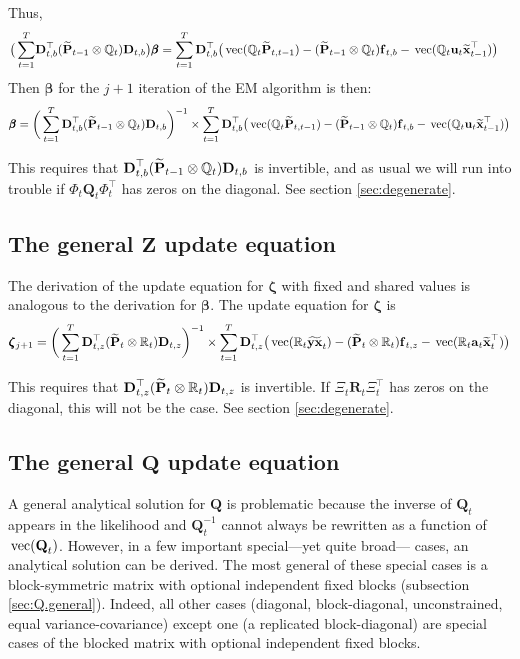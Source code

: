 \documentclass[]{article}
\def\bbeta{\pmb{\beta}}
\def\zzeta{\pmb{\zeta}}
\def\ZZ{\mbox{$\mathbf Z$}}	\def\zz{\mbox{$\mathbf z$}}
\def\DD{\mbox{$\mathbf D$}}	\def\dd{\mbox{$\mathbf d$}}
\def\PP{\mbox{$\mathbf P$}}  \def\pp{\mbox{$\mathbf p$}}
\def\QQ{\mbox{$\mathbf Q$}}	 \def\qq{\mbox{$\mathbf q$}}
\def\RR{\mbox{$\mathbf R$}}	 \def\rr{\mbox{$\mathbf r$}}
\def\vec{\,\textup{\textrm{vec}}}
\def\hatxt{\widetilde{\mbox{$\mathbf x$}}_t}
\def\hatxtm{\widetilde{\mbox{$\mathbf x$}}_{t-1}}
\def\hatYXt{\widetilde{\mbox{$\mathbf{y}\mathbf{x}$}}_t}
\def\hatPt{\widetilde{\PP}_t}
\def\hatPtm{\widetilde{\PP}_{t-1}}
\def\hatPttm{\widetilde{\PP}_{t,t-1}}
\begin{document}
Thus,
\begin{equation}
\begin{split}
\big(\sum_{t=1}^T &\DD_{t,b}^\top(\hatPtm  \otimes \Qm_t)\DD_{t,b} \big)\bbeta 
 =  \sum_{t=1}^T \DD_{t,b}^\top \big(\vec(\Qm_t\hatPttm) - (\hatPtm \otimes \Qm_t)\ff_{t,b} - \vec(\Qm_t\uu_t\hatxtm^\top)  \big)
\end{split}
\end{equation}
Then $\bbeta$ for the $j+1$ iteration of the EM algorithm is then:
\begin{equation}\label{eq:B.general4}
\begin{split}
\bbeta = \bigg(\sum_{t=1}^T \DD_{t,b}^\top(\hatPtm  \otimes \Qm_t)\DD_{t,b} \bigg)^{-1}
\times \sum_{t=1}^T \DD_{t,b}^\top \big(\vec(\Qm_t\hatPttm) - (\hatPtm \otimes \Qm_t)\ff_{t,b} - \vec(\Qm_t\uu_t\hatxtm^\top)  \big)
\end{split}
\end{equation}

This requires that $\DD_{t,b}^\top(\hatPtm  \otimes \Qm_t)\DD_{t,b}$ is invertible, and as usual we will run into trouble if $\Phi_t\QQ_t\Phi_t^\top$ has zeros on the diagonal. See section \ref{sec:degenerate}.

\subsection{The general $\ZZ$ update equation}\label{sec:constZ}
The derivation of the update equation for $\zzeta$ with fixed and shared values is analogous to the derivation for $\bbeta$.  The update equation for $\zzeta$ is
\begin{equation}\label{eq:general.Z.update}
\begin{split}
\zzeta_{j+1} = 
\bigg(\sum_{t=1}^T \DD_{t,z}^\top(\hatPt  \otimes \Rm_t)\DD_{t,z} \bigg)^{-1} 
\times  \sum_{t=1}^T \DD_{t,z}^\top \big(\vec(\Rm_t\hatYXt) - (\hatPt \otimes \Rm_t)\ff_{t,z} - \vec(\Rm_t\aa_t\hatxt^\top)  \big)
\end{split}
\end{equation}

This requires that $\DD_{t,z}^\top(\hatPt \otimes \Rm_t)\DD_{t,z}$ is invertible. If $\Xi_t\RR_t\Xi_t^\top$ has zeros on the diagonal, this will not be the case. See section \ref{sec:degenerate}. 

\subsection{The general $\QQ$ update equation}\label{sec:constrained.Q}
A general analytical solution for $\QQ$ is problematic because the inverse of $\QQ_t$ appears in the likelihood and  $\QQ_t^{-1}$ cannot always be rewritten as a function of $\vec(\QQ_t)$. However, in a few important special---yet quite broad--- cases, an analytical solution can be derived.  The most general of these special cases is a block-symmetric matrix with optional independent fixed blocks (subsection \ref{sec:Q.general}).  Indeed, all other cases (diagonal, block-diagonal, unconstrained, equal variance-covariance) except one (a replicated block-diagonal) are special cases of the blocked matrix with optional independent fixed blocks. 
\end{document}
